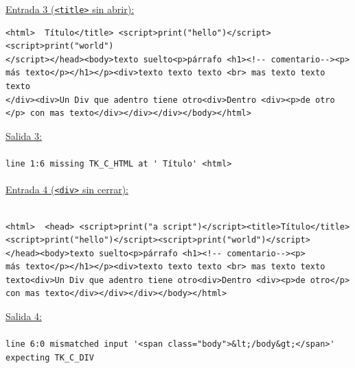 \underline{Entrada 3 (\texttt{<title>} sin abrir):}
\begin{verbatim}
<html>  Título</title> <script>print("hello")</script><script>print("world")
</script></head><body>texto suelto<p>párrafo <h1><!-- comentario--><p> 
más texto</p></h1></p><div>texto texto texto <br> mas texto texto texto
</div><div>Un Div que adentro tiene otro<div>Dentro <div><p>de otro
</p> con mas texto</div></div></div></body></html>
	\end{verbatim}
    
\underline{Salida 3:}
\\\\
\verb|line 1:6 missing TK_C_HTML at ' Título' <html>|\\\\
\underline{Entrada 4 (\texttt{<div>} sin cerrar):}
\\\\
\begin{verbatim}
<html>  <head> <script>print("a script")</script><title>Título</title>
<script>print("hello")</script><script>print("world")</script>
</head><body>texto suelto<p>párrafo <h1><!-- comentario--><p> 
más texto</p></h1></p><div>texto texto texto <br> mas texto texto 
texto<div>Un Div que adentro tiene otro<div>Dentro <div><p>de otro</p> 
con mas texto</div></div></div></body></html>
\end{verbatim}

\underline{Salida 4:}\\\\
{\footnotesize
\verb|line 6:0 mismatched input '<span class="body">&lt;/body&gt;</span>' expecting TK_C_DIV|
}
